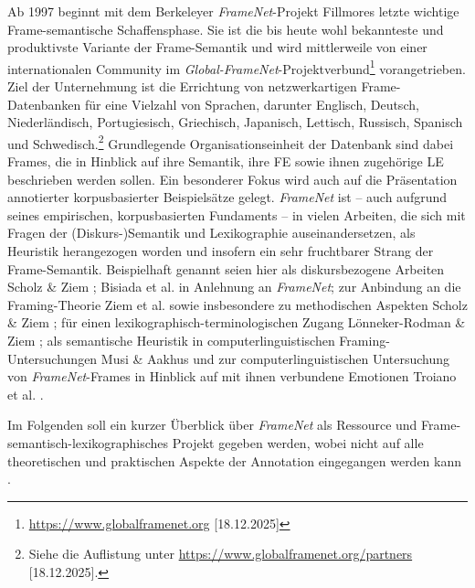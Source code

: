 Ab 1997 beginnt mit dem Berkeleyer \emph{FrameNet}-Projekt Fillmores letzte wichtige Frame-semantische Schaffensphase. Sie ist die bis heute wohl bekannteste und produktivste Variante der Frame-Semantik und wird mittlerweile von einer internationalen Community im \emph{Global-FrameNet}-Projektverbund\footnote{\url{https://www.globalframenet.org} {[}18.12.2025{]}} vorangetrieben. Ziel der Unternehmung ist die Errichtung von netzwerkartigen Frame-Datenbanken für eine Vielzahl von Sprachen, darunter Englisch, Deutsch, Niederländisch, Portugiesisch, Griechisch, Japanisch, Lettisch, Russisch, Spanisch und Schwedisch.\footnote{Siehe die Auflistung unter \url{https://www.globalframenet.org/partners} {[}18.12.2025{]}.} Grundlegende Organisationseinheit der Datenbank sind dabei Frames, die in Hinblick auf ihre Semantik, ihre FE sowie ihnen zugehörige LE beschrieben werden sollen. Ein besonderer Fokus wird auch auf die Präsentation annotierter korpusbasierter Beispielsätze gelegt. \emph{FrameNet} ist -- auch aufgrund seines empirischen, korpusbasierten Fundaments -- in vielen Arbeiten, die sich mit Fragen der (Diskurs\mbox{-})Semantik und Lexikographie auseinandersetzen, als Heuristik herangezogen worden und insofern ein sehr fruchtbarer Strang der Frame-Semantik. Beispielhaft genannt seien hier als diskursbezogene Arbeiten Scholz \& Ziem \autocite*{scholzLexikometrieMeetsFrameNet2013}; Bisiada et al. \autocite*{bisiadaMeTooDreiSprachen2023} in Anlehnung an \emph{FrameNet}; zur Anbindung an die Framing-Theorie Ziem et al. \autocite*{ziemMedienFramesAlsSemantische2018} sowie insbesondere zu methodischen Aspekten Scholz \& Ziem \autocite*{scholzVokabularImDiskurshistorischen2015}; für einen lexikographisch-terminologischen Zugang Lönneker-Rodman \& Ziem \autocite*{loenneker-rodmanFramesAlsRepraesentationsformat2018}; als semantische Heuristik in computerlinguistischen Framing-Untersuchungen Musi \& Aakhus \autocite*{musiFramingFrackingSemantic2019} und zur computerlinguistischen Untersuchung von \emph{FrameNet}-Frames in Hinblick auf mit ihnen verbundene Emotionen Troiano et al. \autocite*{troianoRelationshipFramesEmotionality2023}.

Im Folgenden soll ein kurzer Überblick über \emph{FrameNet} als Ressource und Frame-semantisch-lexikographisches Projekt gegeben werden, wobei nicht auf alle theoretischen und praktischen Aspekte der Annotation eingegangen werden kann \autocite[siehe dazu ausführlich][]{ruppenhoferFrameNetIIExtended2016}.

\label{struktur-eines-frame-eintrags}

